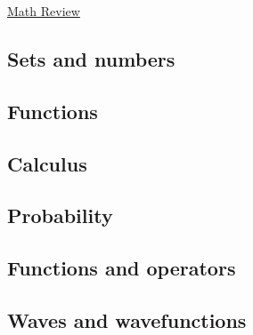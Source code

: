 \documentclass[main.tex]{subfiles}
\begin{document}
\href{https://www2.seas.gwu.edu/~simhaweb/quantum/modules/review/math-review/math-review.html}{Math Review}

\subsection{Sets and numbers}

\subsection{Functions}

\subsection{Calculus}

\subsection{Probability}

\subsection{Functions and operators}

\subsection{Waves and wavefunctions}
\end{document}
